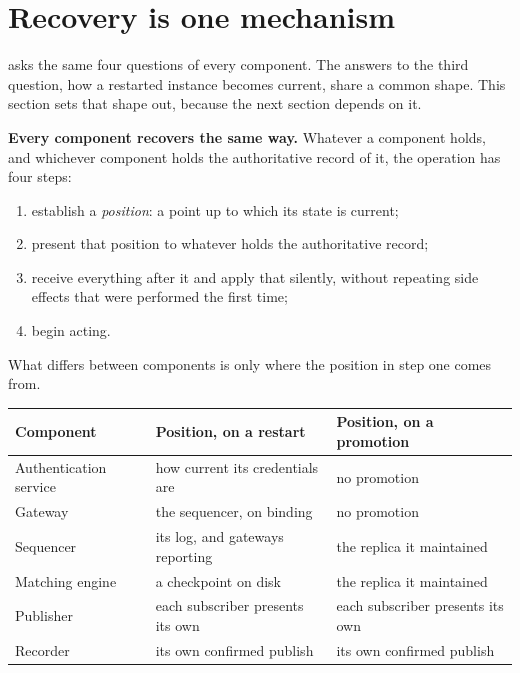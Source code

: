 \section{Recovery is one mechanism}
\label{sec:ha:recovery_shape}

 asks the same four questions of every component. The
answers to the third question, how a restarted instance becomes current, share a
common shape. This section sets that shape out, because the next section depends
on it.

\textbf{Every component recovers the same way.} Whatever a component holds, and
whichever component holds the authoritative record of it, the operation has four
steps:

\begin{enumerate}[nosep]
  \item establish a \emph{position}: a point up to which its state is current;
  \item present that position to whatever holds the authoritative record;
  \item receive everything after it and apply that silently, without repeating
        side effects that were performed the first time;
  \item begin acting.
\end{enumerate}

What differs between components is only where the position in step one comes
from.

\begin{center}
\begin{tabular}{lll}
\toprule
\textbf{Component} & \textbf{Position, on a restart} & \textbf{Position, on a promotion} \\
\midrule
Authentication service & how current its credentials are & no promotion \\
Gateway                & the sequencer, on binding       & no promotion \\
Sequencer              & its log, and gateways reporting & the replica it maintained \\
Matching engine        & a checkpoint on disk            & the replica it maintained \\
Publisher              & each subscriber presents its own & each subscriber presents its own \\
Recorder               & its own confirmed publish        & its own confirmed publish \\
\bottomrule
\end{tabular}
\end{center}

